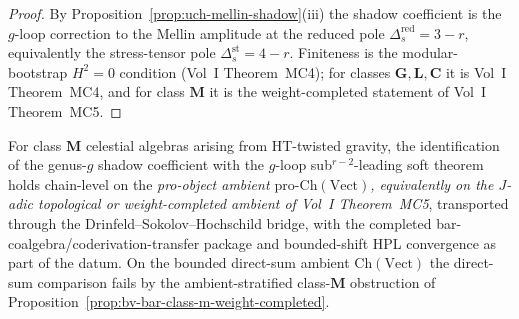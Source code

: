 \begin{proof}
By Proposition~\ref{prop:uch-mellin-shadow}(iii) the shadow
coefficient is the $g$-loop correction to the Mellin amplitude at the
reduced pole $\Delta_s^{\mathrm{red}}=3-r$, equivalently the
stress-tensor pole $\Delta_s^{\mathrm{st}}=4-r$. Finiteness is the
modular-bootstrap
$H^2 = 0$ condition (Vol~I Theorem~MC4); for classes
$\mathbf G, \mathbf L, \mathbf C$ it is Vol~I Theorem~MC4, and for
class $\mathbf M$ it is the weight-completed statement of Vol~I
Theorem~MC5.
\end{proof}

\begin{theorem}
\label{thm:uch-gravity-chain-level}
For class $\mathbf M$ celestial algebras arising from HT-twisted
gravity, the identification of the genus-$g$ shadow coefficient with
the $g$-loop sub${}^{r-2}$-leading soft theorem holds chain-level on
the \emph{pro-object ambient $\mathrm{pro}\text{-}\mathrm{Ch}(\mathrm{Vect})$,
equivalently on the $J$-adic topological or weight-completed ambient
of Vol~I Theorem~MC5}, transported through the
Drinfeld--Sokolov--Hochschild bridge, with the completed
bar-coalgebra/coderivation-transfer package and bounded-shift HPL
convergence as part of the datum. On the bounded direct-sum ambient
$\mathrm{Ch}(\mathrm{Vect})$ the direct-sum comparison fails by the
ambient-stratified class-$\mathbf M$ obstruction of
Proposition~\ref{prop:bv-bar-class-m-weight-completed}.
\end{theorem}

